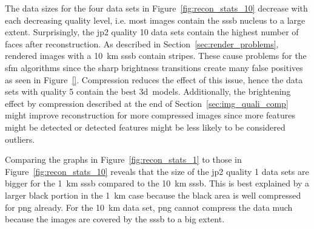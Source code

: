 The data sizes for the four data sets in Figure~\ref{fig:recon_stats_10} decrease with each decreasing quality level, i.e. most images contain the \gls{sssb} nucleus to a large extent. Surprisingly, the \gls{jp2} quality 10 data sets contain the highest number of faces after reconstruction. As described in Section~\ref{sec:render_problems}, rendered images with a \SI{10}{\kilo\meter} \gls{sssb} contain stripes. These cause problems for the \gls{sfm} algorithms since the sharp brightness transitions create many false positives as seen in Figure~\ref{}. Compression reduces the effect of this issue, hence the data sets with quality 5 contain the best \gls{3d}~models. Additionally, the brightening effect by compression described at the end of Section~\ref{sec:img_quali_comp} might improve reconstruction for more compressed images since more features might be detected or detected features might be less likely to be considered outliers.

Comparing the graphs in Figure~\ref{fig:recon_stats_1} to those in Figure~\ref{fig:recon_stats_10} reveals that the size of the \gls{jp2} quality 1 data sets are bigger for the \SI{1}{\kilo\meter} \gls{sssb} compared to the \SI{10}{\kilo\meter} \gls{sssb}. This is best explained by a larger black portion in the \SI{1}{\kilo\meter} case because the black area is well compressed for \gls{png} already. For the \SI{10}{\kilo\meter} data set, \gls{png} cannot compress the data much because the images are covered by the \gls{sssb} to a big extent.

